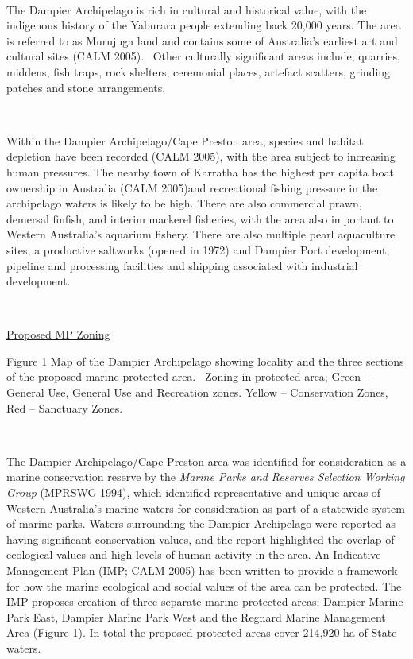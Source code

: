 \documentclass[version=last,
    paper=a4,                               %
    10pt,                                   %
    dvipsnames,
    oneside,                              %
    headings=openany,                       %
    open=any,
    BCOR=7mm,                               %
    DIV=15,     %
]{scrbook}
\begin{document}
~

The Dampier Archipelago is rich in cultural and historical value, with
the indigenous history of the Yaburara people extending back 20,000
years. The area is referred to as Murujuga land and contains some of
Australia's earliest art and cultural sites (CALM 2005).~ Other
culturally significant areas include; quarries, middens, fish traps,
rock shelters, ceremonial places, artefact scatters, grinding patches
and stone arrangements.

~

Within the Dampier Archipelago/Cape Preston area, species and habitat
depletion have been recorded (CALM 2005), with the area subject to
increasing human pressures. The nearby town of Karratha has the highest
per capita boat ownership in Australia (CALM 2005)and recreational
fishing pressure in the archipelago waters is likely to be high. There
are also commercial prawn, demersal finfish, and interim mackerel
fisheries, with the area also important to Western Australia's aquarium
fishery. There are also multiple pearl aquaculture sites, a productive
saltworks (opened in 1972) and Dampier Port development, pipeline and
processing facilities and shipping associated with industrial
development.

~

\href{http://internal-data.dpaw.wa.gov.au/dataset/4afb0762-81ee-4d29-aa12-2728f725d85d/resource/d9b76f02-f7ed-4bcc-b653-c39533d24c8f/download/map-2.jpg}{Proposed
MP Zoning}

Figure 1 Map of the Dampier Archipelago showing locality and the three
sections of the proposed marine protected area.~ Zoning in protected
area; Green -- General Use, General Use and Recreation zones. Yellow --
Conservation Zones, Red -- Sanctuary Zones.

~

The Dampier Archipelago/Cape Preston area was identified for
consideration as a marine conservation reserve by the \emph{Marine Parks
and Reserves Selection Working Group} (MPRSWG 1994), which identified
representative and unique areas of Western Australia's marine waters for
consideration as part of a statewide system of marine parks. Waters
surrounding the Dampier Archipelago were reported as having significant
conservation values, and the report highlighted the overlap of
ecological values and high levels of human activity in the area. An
Indicative Management Plan (IMP; CALM 2005) has been written to provide
a framework for how the marine ecological and social values of the area
can be protected. The IMP proposes creation of three separate marine
protected areas; Dampier Marine Park East, Dampier Marine Park West and
the Regnard Marine Management Area (Figure 1). In total the proposed
protected areas cover 214,920 ha of State waters.
\end{document}
